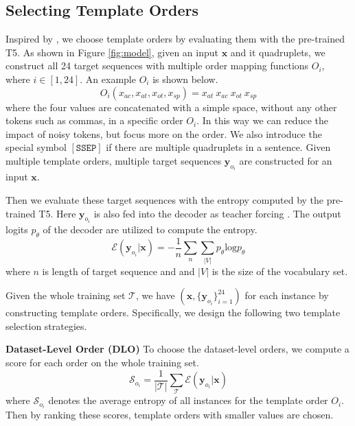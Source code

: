 \documentclass[11pt]{article}
\begin{document}
\subsection{Selecting Template Orders}
Inspired by \cite{yuan2021bartscore,lu2021fantastically}, we choose template orders by evaluating them with the pre-trained T5. As shown in Figure \ref{fig:model}, given an input $\bm{x}$ and it quadruplets, we construct all 24 target sequences with multiple order mapping functions $O_i$, where $i\in{[1,24]}$. An example $O_i$ is shown below.
\begin{equation}
    O_i(x_{ac}, x_{at}, x_{ot}, x_{sp})=x_{at}\ x_{ac}\ x_{ot}\ x_{sp}
\end{equation} 
where the four values are concatenated with a simple space, without any other tokens such as commas, in a specific order $O_i$. In this way we can reduce the impact of noisy tokens, but focus more on the order. We also introduce the special symbol $\mathtt{[SSEP]}$ if there are multiple quadruplets in a sentence. Given multiple template orders, multiple target sequences $\bm{y}_{o_i}$ are constructed for an input $\bm{x}$.



Then we evaluate these target sequences with the entropy computed by the pre-trained T5. Here $\bm{y}_{o_i}$ is also fed into the decoder as teacher forcing \cite{williams1989learning}. The output logits $p_\theta$ of the decoder are utilized to compute the entropy.
\begin{equation}
\mathcal{E}(\bm{y}_{o_i}|\bm{x})=-\frac{1}{n}\sum_{n}\sum_{|V|}{p_\theta}\mathrm{log} p_\theta
    \label{eq:entropy}
\end{equation}
where $n$ is length of target sequence and and $|V|$ is the size of the vocabulary set. 

Given the whole training set $\mathcal{T}$, we have $(\bm{x},\{\bm{y}_{o_i}\}_{i=1}^{24})$ for each instance by constructing template orders. Specifically, we design the following two template selection strategies. 



\vspace{6pt}
\noindent
\textbf{Dataset-Level Order (DLO)} \; To choose the dataset-level orders, we compute a score for each order on the whole training set.
\begin{equation}
    \mathcal{S}_{o_i}=\frac{1}{|\mathcal{T}|}\sum_{\mathcal{T}}\mathcal{E}(\bm{y}_{o_i}|\bm{x})
\end{equation}
where $\mathcal{S}_{o_i}$ denotes the average entropy of all instances for the template order $O_i$. Then by ranking these scores, template orders with smaller values are chosen. 
\end{document}
